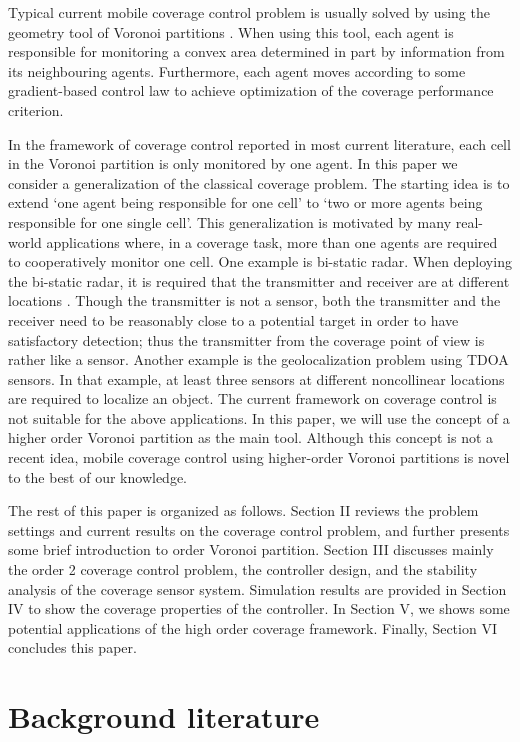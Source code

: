 \documentclass[letterpaper, 10 pt, conference]{ieeeconf}
\begin{document}
Typical current mobile coverage control problem is usually solved by using the geometry tool of  Voronoi partitions \cite{de2000computational}. When using this tool, each agent is responsible for monitoring a convex area determined in part by information from its neighbouring agents. Furthermore, each agent moves according to some gradient-based control law to achieve optimization of the coverage performance criterion.

In the framework of coverage control reported in most current literature, each cell in the Voronoi partition is only monitored by one agent.
In this paper we consider a generalization of the classical coverage problem. The starting
idea is to extend `one agent being responsible for one cell' to `two or more agents being responsible for one single cell'. This generalization is motivated by
many real-world applications where, in a coverage task, more than one agents are required to cooperatively monitor one cell. One example is bi-static radar. When deploying the bi-static radar, it is required that the transmitter and receiver are at different locations \cite{4201772}. Though the transmitter is not a sensor, both the transmitter and the receiver need to be reasonably close to a potential target in order to have satisfactory detection; thus the transmitter from the coverage point of view is rather like a sensor.
Another example is the geolocalization problem using TDOA sensors. In that example, at least three sensors at different noncollinear locations are required to localize an object.
The current framework on coverage control is not suitable for the above applications. In this paper, we will use the concept of a higher order Voronoi partition as the main tool. Although this concept is not a recent idea, mobile coverage control using  higher-order Voronoi partitions is novel to the best of our knowledge.

The rest of this paper is organized as follows. Section II reviews the problem settings and current results on the coverage control problem, and further presents some brief introduction to order   Voronoi partition. Section III discusses mainly the order 2 coverage control problem, the controller design,  and the stability analysis of the coverage sensor system. Simulation results are provided in Section IV to show the coverage properties of the controller. In Section V, we shows some potential applications of the high order coverage framework.  Finally, Section VI concludes this paper.

\section{Background literature}
\end{document}
